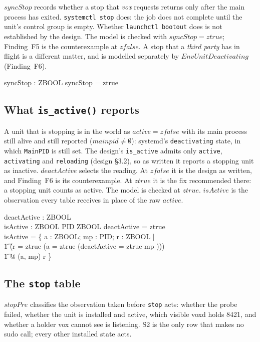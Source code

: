 \documentclass[a4paper,10pt,fleqn]{article}
\begin{document}
$syncStop$ records whether a stop that \emph{vox} requests returns only after
the main process has exited. \texttt{systemctl stop} does: the job does not
complete until the unit's control group is empty. Whether \texttt{launchctl
bootout} does is not established by the design. The model is checked with
$syncStop = ztrue$; Finding~F5 is the counterexample at $zfalse$. A stop that
a \emph{third party} has in flight is a different matter, and is modelled
separately by $EnvUnitDeactivating$ (Finding~F6).

\begin{axdef}
  syncStop : ZBOOL
\where
  syncStop = ztrue
\end{axdef}

\subsection{What \texttt{is\_active()} reports}

A unit that is stopping is in the world as $active = zfalse$ with its main
process still alive and still reported ($mainpid \neq \emptyset$): systemd's
\texttt{deactivating} state, in which \texttt{MainPID} is still set. The
design's \texttt{is\_active} admits only \texttt{active}, \texttt{activating}
and \texttt{reloading} (design \S3.2), so as written it reports a stopping
unit as inactive. $deactActive$ selects the reading. At $zfalse$ it is the
design as written, and Finding~F6 is its counterexample. At $ztrue$ it is
the fix recommended there: a stopping unit counts as active. The model is
checked at $ztrue$. $isActive$ is the observation every table receives in
place of the raw $active$.

\begin{axdef}
  deactActive : ZBOOL \\
  isActive : ZBOOL \cross \power PID \fun ZBOOL
\where
  deactActive = ztrue \\
  isActive = \{ a : ZBOOL; mp : \power PID; r : ZBOOL | \\
  \t1 (r = ztrue \iff (a = ztrue \lor
    (deactActive = ztrue \land mp \neq \emptyset))) \\
  \t1 @ (a, mp) \mapsto r \}
\end{axdef}

\subsection{The \texttt{stop} table}

$stopPre$ classifies the observation taken before \texttt{stop} acts: whether
the probe failed, whether the unit is installed and active, which visible voxd
holds 8421, and whether a holder vox cannot see is listening. S2 is the only
row that makes no sudo call; every other installed state acts.
\end{document}
